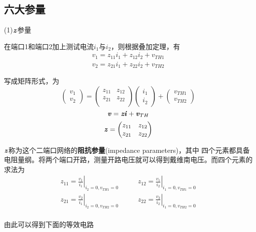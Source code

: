     \subsection{六大参量}
    \par (1)$\textbf{\textit{z}}$参量
    \par 在端口1和端口2加上测试电流$i_{1}$与$i_{2}$，则根据叠加定理，有
    \begin{align*}
        v_1=z_{11}i_1+z_{12}i_2+v_{TH1}\\
        v_2=z_{21}i_1+z_{22}i_2+v_{TH2}
    \end{align*}
    \par 写成矩阵形式，为
    \[
    \begin{pmatrix}
        v_1\\v_2
    \end{pmatrix}=
    \begin{pmatrix}
        z_{11} & z_{12} \\
        z_{21} & z_{22} \\
    \end{pmatrix}
    \begin{pmatrix}
        i_{1} \\ i_{2}
    \end{pmatrix}
    +
    \begin{pmatrix}
        v_{TH1} \\ v_{TH2}
    \end{pmatrix}
    \]
    \[
    \textbf{\textit{v}}=\textbf{\textit{zi}}+\textbf{\textit{v}}_{TH}   
    \]
    \[
    \textbf{\textit{z}}=
    \begin{pmatrix}
        z_{11} & z_{12} \\
        z_{21} & z_{22} \\
    \end{pmatrix}
    \]
    \par $\textbf{\textit{z}}$称为这个二端口网络的\textbf{阻抗参量}(impedance parameters)，其中
    四个元素都具备电阻量纲。将两个端口开路，测量开路电压就可以得到戴维南电压。而四个元素的求法为
    \begin{align*}
        z_{11}=\left.\frac{v_1}{i_1}\right|_{i_2=0,v_{TH1}=0} \qquad&
        z_{12}=\left.\frac{v_1}{i_2}\right|_{i_1=0,v_{TH1}=0} \\
        z_{21}=\left.\frac{v_2}{i_1}\right|_{i_2=0,v_{TH2}=0} \qquad&
        z_{22}=\left.\frac{v_2}{i_2}\right|_{i_1=0,v_{TH2}=0} \\
    \end{align*}
    \par 由此可以得到下面的等效电路
